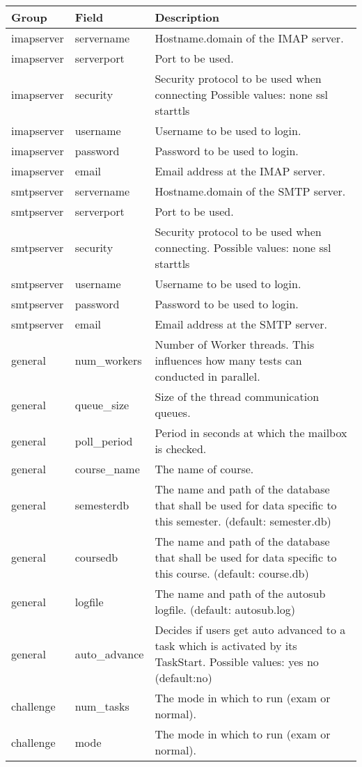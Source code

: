 \begin{tabular}{|p{2.5cm}|p{2.5cm}|p{8cm}|}
\hline
{\bf Group} & {\bf Field} & {\bf Description} \\
\hline
\hline
imapserver & servername & Hostname.domain of the IMAP server.\\
\hline
imapserver & serverport & Port to be used.\\
\hline
imapserver & security & Security protocol to be used when connecting 
    Possible values: none ssl starttls \\
\hline
imapserver & username & Username to be used to login. \\ 
\hline
imapserver & password & Password to be used to login. \\
\hline
imapserver & email & Email address at the IMAP server. \\
\hline
\hline
smtpserver & servername & Hostname.domain of the SMTP server.\\
\hline
smtpserver & serverport & Port to be used. \\
\hline
smtpserver & security & Security protocol to be used when connecting.
    Possible values: none ssl starttls \\
\hline
smtpserver & username & Username to be used to login. \\
\hline
smtpserver & password & Password to be used to login. \\
\hline
smtpserver & email & Email address at the SMTP server. \\
\hline
\hline
general & num\_workers & Number of Worker threads. This influences how many
	tests can conducted in parallel. \\
\hline
general & queue\_size & Size of the thread communication queues. \\
\hline
general & poll\_period & Period in seconds at which the mailbox is checked.\\
\hline
general & course\_name & The name of course.\\
\hline
general & semesterdb & The name and path of the database that shall be used for data specific to
    this semester. (default: semester.db) \\
\hline
general & coursedb & The name and path of the database that shall be used for data specific to
    this course. (default: course.db)\\
\hline
general & logfile & The name and path of the autosub logfile. (default: autosub.log)\\
\hline
general & auto\_advance & Decides if users get auto advanced to a task which is
    activated by its TaskStart. Possible values: yes no (default:no) \\
\hline
challenge & num\_tasks & The mode in which to run (exam or normal).\\
\hline
challenge & mode & The mode in which to run (exam or normal). \\ 
\hline
\end{tabular}

